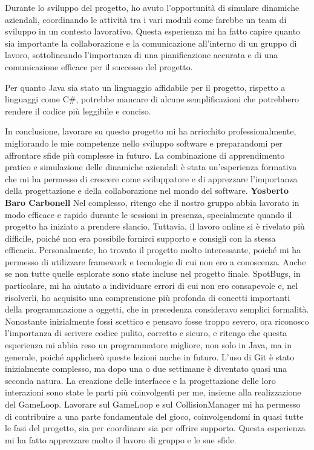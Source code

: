 \documentclass[a4paper,12pt]{report}
\begin{document}
Durante lo sviluppo del progetto, ho avuto l'opportunità di simulare dinamiche aziendali, coordinando le attività tra i vari moduli come farebbe un team di sviluppo in un contesto lavorativo. Questa esperienza mi ha fatto capire quanto sia importante la collaborazione e la comunicazione all'interno di un gruppo di lavoro, sottolineando l'importanza di una pianificazione accurata e di una comunicazione efficace per il successo del progetto.\newline

Per quanto Java sia stato un linguaggio affidabile per il progetto, rispetto a linguaggi come C\#, potrebbe mancare di alcune semplificazioni che potrebbero rendere il codice più leggibile e conciso.\newline

In conclusione, lavorare su questo progetto mi ha arricchito professionalmente, migliorando le mie competenze nello sviluppo software e preparandomi per affrontare sfide più complesse in futuro. La combinazione di apprendimento pratico e simulazione delle dinamiche aziendali è stata un'esperienza formativa che mi ha permesso di crescere come sviluppatore e di apprezzare l'importanza della progettazione e della collaborazione nel mondo del software.\newline\newline
\textbf{Yosberto Baro Carbonell}\newline
Nel complesso, ritengo che il nostro gruppo abbia lavorato in modo efficace e rapido durante le sessioni in presenza, specialmente quando il progetto ha iniziato a prendere slancio. Tuttavia, il lavoro online si è rivelato più difficile, poiché non era possibile fornirci supporto e consigli con la stessa efficacia. 
Personalmente, ho trovato il progetto molto interessante, poiché mi ha permesso di utilizzare framework e tecnologie di cui non ero a conoscenza. Anche se non tutte quelle esplorate sono state incluse nel progetto finale. SpotBugs, in particolare, mi ha aiutato a individuare errori di cui non ero consapevole e, nel risolverli, ho acquisito una comprensione più profonda di concetti importanti della programmazione a oggetti, che in precedenza consideravo semplici formalità. Nonostante inizialmente fossi scettico e pensavo fosse troppo severo, ora riconosco l'importanza di scrivere codice pulito, corretto e sicuro, e ritengo che questa esperienza mi abbia reso un programmatore migliore, non solo in Java, ma in generale, poiché applicherò queste lezioni anche in futuro.
L'uso di Git è stato inizialmente complesso, ma dopo una o due settimane è diventato quasi una seconda natura. La creazione delle interfacce e la progettazione delle loro interazioni sono state le parti più coinvolgenti per me, insieme alla realizzazione del GameLoop. Lavorare sul GameLoop e sul CollisionManager mi ha permesso di contribuire a una parte fondamentale del gioco, coinvolgendomi in quasi tutte le fasi del progetto, sia per coordinare sia per offrire supporto. Questa esperienza mi ha fatto apprezzare molto il lavoro di gruppo e le sue sfide.
\end{document}
